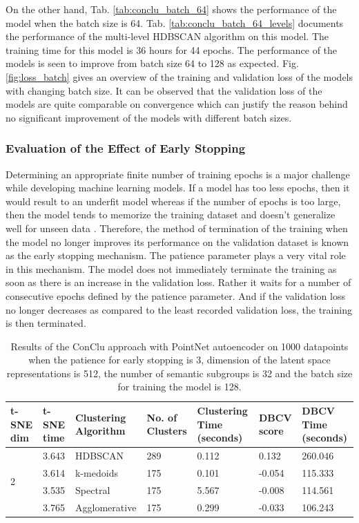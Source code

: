 On the other hand, Tab. \ref{tab:conclu_batch_64} shows the performance of the model when the batch size is 64. Tab. \ref{tab:conclu_batch_64_levels} documents the performance of the multi-level \ac{HDBSCAN} algorithm on this model. The training time for this model is 36 hours for 44 epochs. The performance of the models is seen to improve from batch size 64 to 128 as expected. Fig. \ref{fig:loss_batch} gives an overview of the training and validation loss of the models with changing batch size. It can be observed that the validation loss of the models are quite comparable on convergence which can justify the reason behind no significant improvement of the models with different batch sizes. 

\subsubsection{Evaluation of the Effect of Early Stopping}
Determining an appropriate finite number of training epochs is a major challenge while developing machine learning models. If a model has too less epochs, then it would result to an underfit model whereas if the number of epochs is too large, then the model tends to memorize the training dataset and doesn't generalize well for unseen data \cite{Goodfellow-et-al-2016}. Therefore, the method of termination of the training when the model no longer improves its performance on the validation dataset is known as the early stopping mechanism. The patience parameter plays a very vital role in this mechanism. The model does not immediately terminate the training as soon as there is an increase in the validation loss. Rather it waits for a number of consecutive epochs defined by the patience parameter. And if the validation loss no longer decreases as compared to the least recorded validation loss, the training is then terminated.

\begin{table}[H]
  \setlength\extrarowheight{10pt}
  \caption{Results of the ConClu approach with PointNet autoencoder on 1000 datapoints when the patience for early stopping is 3, dimension of the latent space representations is 512, the number of semantic subgroups is 32 and the batch size for training the model is 128. }
  \centering
  \begin{tabular}{|p{30pt}|p{50pt}|p{60pt}|p{50pt}|p{50pt}|p{50pt}|p{40pt}|}
    \toprule
    \ac{t-SNE} dim	& \ac{t-SNE} time & Clustering Algorithm & No. of Clusters & Clustering Time (seconds) & \ac{DBCV} score & \ac{DBCV} Time (seconds)\\
    \midrule
    \multirow{4}{30pt}{2}	& 3.643 & \ac{HDBSCAN}	& 289	& 0.112 & 0.132	& 260.046 \\ \cline{2-7} 
    & 3.614 & k-medoids	& 175	& 0.101	& -0.054	& 115.333 \\ \cline{2-7} 
    & 3.535 & Spectral	& 175	& 5.567	& -0.008	& 114.561 \\ \cline{2-7}
    & 3.765 & Agglomerative	& 175	& 0.299	& -0.033	& 106.243 \\ 
    \bottomrule
  \end{tabular}
  \label{tab:conclu_patience_3}
\end{table}

